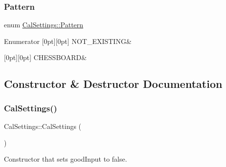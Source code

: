 \subsubsection{\texorpdfstring{Pattern}{Pattern}}
{\footnotesize\ttfamily enum \mbox{\hyperlink{class_cal_settings_a0a24f2a2a233efe9213f28e527314500}{Cal\+Settings\+::\+Pattern}}}

\begin{DoxyEnumFields}{Enumerator}
[0pt][0pt]{}\mbox{\label{class_cal_settings_a0a24f2a2a233efe9213f28e527314500ae4a4d43b266ad7071b87781d63db6325}} 
N\+O\+T\+\_\+\+E\+X\+I\+S\+T\+I\+NG&\\
\hline

[0pt][0pt]{}\mbox{\label{class_cal_settings_a0a24f2a2a233efe9213f28e527314500abbce277bb8f1f2450efbf10d14258264}} 
C\+H\+E\+S\+S\+B\+O\+A\+RD&\\
\hline

\end{DoxyEnumFields}


\subsection{Constructor \& Destructor Documentation}
\mbox{\label{class_cal_settings_aaac5ae85b32281c75a540211a183ae5b}} 
\subsubsection{\texorpdfstring{CalSettings()}{CalSettings()}}
{\footnotesize\ttfamily Cal\+Settings\+::\+Cal\+Settings (\begin{DoxyParamCaption}{ }\end{DoxyParamCaption})\hspace{0.3cm}{\ttfamily [inline]}}



Constructor that sets {\ttfamily good\+Input} to false. 



